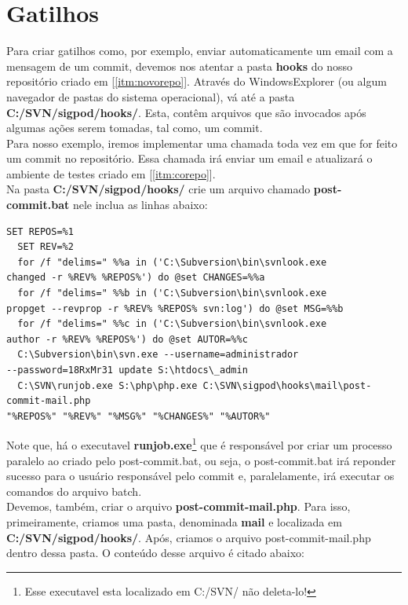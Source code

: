 \documentclass[a4paper,10pt]{article}
\begin{document}
\section{Gatilhos}
Para criar gatilhos como, por exemplo, enviar automaticamente um email com a mensagem de um commit, devemos nos atentar a pasta \textbf{hooks} do nosso repositório criado em [\ref{itm:novorepo}].
Através do WindowsExplorer (ou algum navegador de pastas do sistema operacional), vá até a pasta \textbf{C:/SVN/sigpod/hooks/}. Esta, contêm arquivos que são invocados após algumas ações serem tomadas, tal como, um commit.\\ Para nosso exemplo, iremos implementar uma chamada toda vez em que for feito um commit no repositório. Essa chamada irá enviar um email e atualizará o ambiente de testes criado em [\ref{itm:corepo}].\\
Na pasta \textbf{C:/SVN/sigpod/hooks/} crie um arquivo chamado \textbf{post-commit.bat} nele inclua as linhas abaixo:
\begin{lstlisting}[caption={algoritmo pós commit}]
  SET REPOS=%1
  SET REV=%2
  for /f "delims=" %%a in ('C:\Subversion\bin\svnlook.exe 
changed -r %REV% %REPOS%') do @set CHANGES=%%a
  for /f "delims=" %%b in ('C:\Subversion\bin\svnlook.exe 
propget --revprop -r %REV% %REPOS% svn:log') do @set MSG=%%b
  for /f "delims=" %%c in ('C:\Subversion\bin\svnlook.exe 
author -r %REV% %REPOS%') do @set AUTOR=%%c
  C:\Subversion\bin\svn.exe --username=administrador 
--password=18RxMr31 update S:\htdocs\_admin
  C:\SVN\runjob.exe S:\php\php.exe C:\SVN\sigpod\hooks\mail\post-commit-mail.php 
"%REPOS%" "%REV%" "%MSG%" "%CHANGES%" "%AUTOR%"
\end{lstlisting}
Note que, há o executavel \textbf{runjob.exe}\footnote{Esse executavel esta localizado em C:/SVN/ não deleta-lo!} que é responsável por criar um processo paralelo ao criado pelo post-commit.bat, ou seja, o post-commit.bat irá reponder sucesso para o usuário responsável pelo commit e, paralelamente, irá executar os comandos do arquivo batch.\\
Devemos, também, criar o arquivo \textbf{post-commit-mail.php}. Para isso, primeiramente, criamos uma pasta, denominada \textbf{mail} e localizada em \textbf{C:/SVN/sigpod/hooks/}. Após, criamos o arquivo post-commit-mail.php dentro dessa pasta. O conteúdo desse arquivo é citado abaixo:
\end{document}
